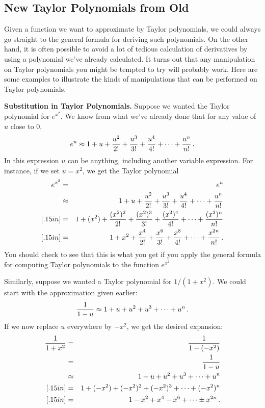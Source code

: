 {{{{\subsection{New Taylor Polynomials from Old}

Given a function we want to approximate by Taylor polynomials, we could always go straight to the general formula for deriving such polynomials.  On the other hand, it is often possible to avoid a lot of tedious calculation of derivatives by using a polynomial we've already calculated. It turns out that any manipulation on Taylor polynomials you might be tempted to try will probably work.  Here are some examples to illustrate the kinds of manipulations that can be performed on Taylor polynomials.

\medskip



{\bf Substitution in Taylor Polynomials.}  Suppose we wanted the Taylor polynomial for $e^{x^2}$.  We know from what we've already done that for any value of $u$ close to 0,
\[
e^u \approx {\displaystyle 1 + u + {u^2 \over 2!} + {u^3 \over 3!} 
                + {u^4 \over 4!} + \cdots + {u^n \over n!}} \, .
\]
In this expression $u$ can be anything, including another variable expression.  For instance, if we set $u=x^2$, we get the Taylor polynomial
\begin{eqnarray*}
e^{x^2} & =& e^u \\
         &\approx & {\displaystyle 1 + u + {u^2 \over 2!} + {u^3 \over 3!} 
                + {u^4 \over 4!} + \cdots + {u^n \over n!}} \\ [.15in]
        &=&{\displaystyle 1 + (x^2) + {(x^2)^2 \over 2!} + {(x^2)^3 \over 3!} + {(x^2)^4 \over 4!} + \cdots + {(x^2)^n \over n!} }\\ [.15in]
        & = & {\displaystyle 1 + x^2 + {x^4 \over 2!} + {x^6 \over 3!} + {x^8 \over 4!} + \cdots + {x^{2n} \over n!} }\,.
\end{eqnarray*}
You should check to see that this is what you get if you apply the general formula for computing Taylor polynomials to the function $e^{x^2}$.

Similarly, suppose we wanted a Taylor polynomial for $1/(1+x^2)$.  We could start with the approximation given earlier:
\[
{\displaystyle {1 \over {1-u}} }\approx {\displaystyle 1+u+u^2+u^3+\cdots +u^n} \, .
\]
If we now replace $u$ everywhere by $-x^2$, we get the desired expansion:
\begin{eqnarray*}
{\displaystyle {1 \over {1+x^2}} } & = & {\displaystyle {1\over {1-(-x^2)}}} \\
        & = &{\displaystyle {1 \over {1-u}} } \\
        & \approx & {\displaystyle 1+u+u^2+u^3+\cdots +u^n} \\ [.15in]
        & = & {\displaystyle 1+(-x^2)+(-x^2)^2+(-x^2)^3+\cdots +(-x^2)^n} \\ [.15in]
        & = & {\displaystyle 1-x^2+x^4-x^6+\cdots \pm x^{2n}} \,.
\end{eqnarray*}

}}}}
